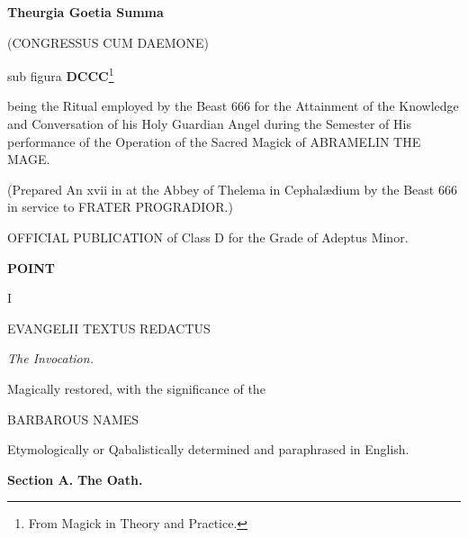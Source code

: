 
{\centering
  \large
  \textbf{Theurgia Goetia Summa}

  (CONGRESSUS CUM DAEMONE)

sub figura \textbf{DCCC}\footnote{From Magick in Theory and Practice.}
\par}

being the Ritual employed by the Beast 666 for the Attainment of the Knowledge and Conversation of his Holy Guardian Angel during the Semester of His performance of the Operation of the Sacred Magick of ABRAMELIN THE MAGE.

(Prepared An xvii \Sun{} in \virgo{} at the Abbey of Thelema in Cephal\ae{}dium by the Beast 666 in service to FRATER PROGRADIOR.)

OFFICIAL PUBLICATION of \Argentium{} Class D for the Grade of Adeptus Minor.

\clearpage
{\centering
\textbf{POINT}

I

EVANGELII TEXTUS REDACTUS
\par}

\textit{The Invocation.}

Magically restored, with the significance of the

{\centering
  BARBAROUS NAMES
\par}

Etymologically or Qabalistically determined and paraphrased in English.

\textbf{Section A.} \hfill \textbf{The Oath.}

